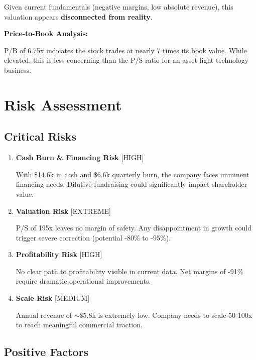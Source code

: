 \documentclass[11pt,a4paper]{article}
\begin{document}
Given current fundamentals (negative margins, low absolute revenue), this valuation appears \textbf{disconnected from reality}.

\textbf{Price-to-Book Analysis:}

P/B of 6.75x indicates the stock trades at nearly 7 times its book value. While elevated, this is less concerning than the P/S ratio for an asset-light technology business.

\newpage

\section{Risk Assessment}

\subsection{Critical Risks}

\begin{enumerate}[itemsep=8pt]
    \item \textbf{Cash Burn \& Financing Risk} \textcolor{bearish}{[HIGH]}
    
    With \$14.6k in cash and \$6.6k quarterly burn, the company faces imminent financing needs. Dilutive fundraising could significantly impact shareholder value.
    
    \item \textbf{Valuation Risk} \textcolor{bearish}{[EXTREME]}
    
    P/S of 195x leaves no margin of safety. Any disappointment in growth could trigger severe correction (potential -80\% to -95\%).
    
    \item \textbf{Profitability Risk} \textcolor{bearish}{[HIGH]}
    
    No clear path to profitability visible in current data. Net margins of -91\% require dramatic operational improvements.
    
    \item \textbf{Scale Risk} \textcolor{neutral}{[MEDIUM]}
    
    Annual revenue of $\sim$\$5.8k is extremely low. Company needs to scale 50-100x to reach meaningful commercial traction.
\end{enumerate}

\subsection{Positive Factors}
\end{document}
